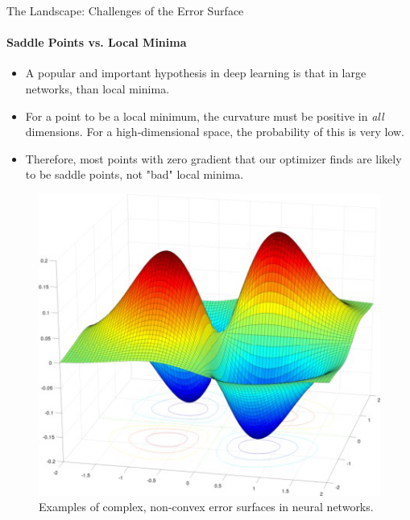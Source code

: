 \begin{frame}{The Landscape: Challenges of the Error Surface}
    \framesubtitle{Saddle Points vs. Local Minima}
    \begin{itemize}
        \item A popular and important hypothesis in deep learning is that in large networks,  than local minima.
        \item For a point to be a local minimum, the curvature must be positive in \emph{all} dimensions. For a high-dimensional space, the probability of this is very low.
        \item Therefore, most points with zero gradient that our optimizer finds are likely to be saddle points, not "bad" local minima.
    \end{itemize}
    \begin{figure}
        \centering
        \includegraphics[width=0.5\linewidth]{images/error_surfaces.png}
        \caption{Examples of complex, non-convex error surfaces in neural networks.}
    \end{figure}
\end{frame}